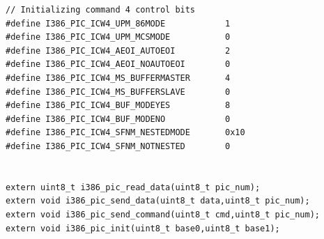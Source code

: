 \documentclass[document.tex]{subfiles}
\begin{document}
\begin{english}
\begin{lstlisting}[label=lst:pic_interface,caption=\en{hal/pic.h: PIC Interface}]
// Initializing command 4 control bits
#define I386_PIC_ICW4_UPM_86MODE			1
#define I386_PIC_ICW4_UPM_MCSMODE			0
#define I386_PIC_ICW4_AEOI_AUTOEOI			2
#define I386_PIC_ICW4_AEOI_NOAUTOEOI		0
#define I386_PIC_ICW4_MS_BUFFERMASTER		4
#define I386_PIC_ICW4_MS_BUFFERSLAVE		0
#define I386_PIC_ICW4_BUF_MODEYES			8
#define I386_PIC_ICW4_BUF_MODENO			0
#define I386_PIC_ICW4_SFNM_NESTEDMODE		0x10
#define I386_PIC_ICW4_SFNM_NOTNESTED		0


extern uint8_t i386_pic_read_data(uint8_t pic_num);
extern void i386_pic_send_data(uint8_t data,uint8_t pic_num);
extern void i386_pic_send_command(uint8_t cmd,uint8_t pic_num);
extern void i386_pic_init(uint8_t base0,uint8_t base1);

\end{lstlisting}
\end{english}
\end{document}
